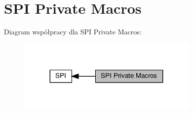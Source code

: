 \hypertarget{group___s_p_i___private___macros}{}\section{S\+PI Private Macros}
\label{group___s_p_i___private___macros}
Diagram współpracy dla S\+PI Private Macros\+:\nopagebreak
\begin{figure}[H]
\begin{center}
\leavevmode
\includegraphics[width=251pt]{group___s_p_i___private___macros}
\end{center}
\end{figure}
